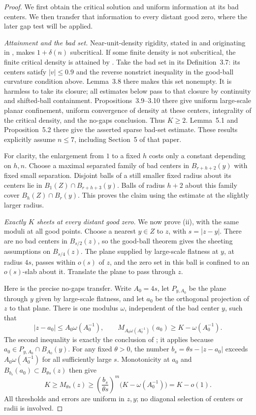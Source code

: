 \begin{proof}
We first obtain the critical solution and uniform information at its bad
centers. We then transfer that information to every distant good zero,
where the later gap test will be applied.

\emph{Attainment and the bad set.}
Near-unit-density rigidity, stated in \cite[Theorem~2.16]{FSS2025}
and originating in \cite[Theorem~11.1]{Wang2017}, makes
\(1+\delta(n)\) subcritical.  If some finite density is not subcritical,
the finite critical density is attained by
\cite[Proposition~3.6]{FSS2025}.  Take the bad set in its
Definition~3.7: its centers satisfy \(|v|\le0.9\) and the reverse
nonstrict inequality in the good-ball curvature condition above.
Lemma~3.8 there makes this set nonempty.
It is harmless to take its closure; all estimates below pass to that
closure by continuity and shifted-ball containment.
Propositions~3.9--3.10 there give uniform large-scale planar confinement,
uniform convergence of density at these centers, integrality of the
critical density, and the no-gaps conclusion.  Thus \(K\ge2\).
Lemma~5.1 and Proposition~5.2 there give the asserted sparse bad-set
estimate.  These results explicitly assume \(n\le7\), including
Section~5 of that paper.

For clarity, the enlargement from \(1\) to a fixed \(h\) costs only a
constant depending on \(h,n\).  Choose a maximal separated family of
bad centers in \(B_{r+h+2}(y)\) with fixed small separation.
Disjoint balls of a still smaller fixed radius about its centers lie
in \(B_1(Z)\cap B_{r+h+3}(y)\).  Balls of radius \(h+2\) about this
family cover \(B_h(Z)\cap B_r(y)\).  This proves the claim using
the estimate at the slightly larger radius.

\emph{Exactly $K$ sheets at every distant good zero.}
We now prove (ii), with the same moduli at all good points.  Choose a nearest
\(y\in Z\) to \(z\), with \(s=|z-y|\).  There are no bad centers in
\(B_{s/2}(z)\), so the good-ball theorem gives the sheeting assumptions
on \(B_{s/4}(z)\).  The plane supplied by large-scale flatness at
\(y\), at radius \(4s\), passes within \(o(s)\) of \(z\), and the zero
set in this ball is confined to an \(o(s)\)-slab about it.  Translate
the plane to pass through \(z\).

Here is the precise no-gaps transfer.  Write \(A_0=4s\), let
\(P_{y,A_0}\) be the plane through \(y\) given by large-scale
flatness, and let \(a_0\) be the orthogonal projection of \(z\)
to that plane.  There is one modulus \(\omega\), independent of
the bad center \(y\), such that
\[
 |z-a_0|\le A_0\omega(A_0^{-1}),\qquad
 M_{A_0\omega(A_0^{-1})}(a_0)\ge K-\omega(A_0^{-1}).
\]
The second inequality is exactly the conclusion of
\cite[Proposition~3.10]{FSS2025}; it applies because
\(a_0\in P_{y,A_0}\cap B_{A_0}(y)\).
For any fixed \(\theta>0\), the number
\(b_s=\theta s-|z-a_0|\) exceeds
\(A_0\omega(A_0^{-1})\) for all sufficiently large \(s\).
Monotonicity at \(a_0\) and \(B_{b_s}(a_0)\subset B_{\theta s}(z)\)
then give
\[
 K\ge M_{\theta s}(z)
 \ge\left(\frac{b_s}{\theta s}\right)^m
       \bigl(K-\omega(A_0^{-1})\bigr)=K-o(1).
\]
All thresholds and errors are uniform in \(z,y\); no diagonal
selection of centers or radii is involved.


\end{proof}
